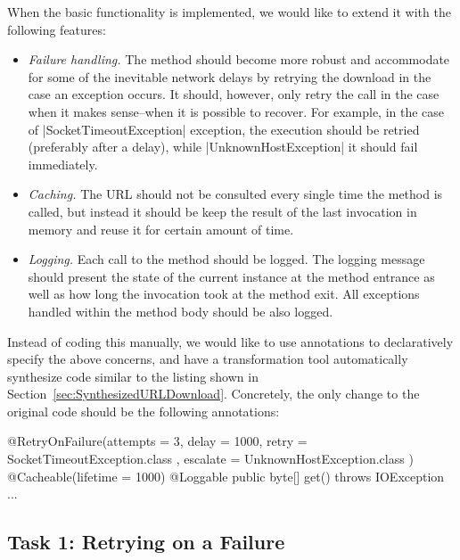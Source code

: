 When the basic functionality is implemented, we would like to extend it with the following features:

\begin{itemize}[--]
   \item \emph{Failure handling.} The method should become more robust and accommodate for some of the inevitable network delays by retrying the download in the case an exception occurs.
   It should, however, only retry the call in the case when it makes sense--\Ie when it is possible to recover.
   For example, in the case of \javainline|SocketTimeoutException| exception, the execution should be retried (preferably after a delay), while \javainline|UnknownHostException| it should fail immediately.
   \item \emph{Caching.} The URL should not be consulted every single time the method is called, but instead it should be keep the result of the last invocation in memory and reuse it for certain amount of time.
   \item \emph{Logging.} Each call to the method should be logged.
   The logging message should present the state of the current instance at the method entrance as well as how long the invocation took at the method exit.
   All exceptions handled within the method body should be also logged.
\end{itemize} 

Instead of coding this manually, we would like to use annotations to declaratively specify the above concerns, and have a transformation tool automatically synthesize code similar to the listing shown in Section~\ref{sec:SynthesizedURLDownload}.
Concretely, the only change to the original code should be the following annotations:
%
\begin{javacode}
@RetryOnFailure(attempts = 3, delay = 1000, retry = { SocketTimeoutException.class }, escalate = { UnknownHostException.class })
@Cacheable(lifetime = 1000)
@Loggable
public byte[] get() throws IOException { ... }
\end{javacode}

\subsection{Task 1: Retrying on a Failure}

